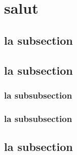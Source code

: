 \documentclass{classe-tex3R-2-1}
\begin{document}










\titreactif




\section{salut}

\subsection{la subsection}

\subsection{la subsection}

\subsubsection{la subsubsection}

\subsubsection{la subsubsection}

\subsection{la subsection}
\end{document}
